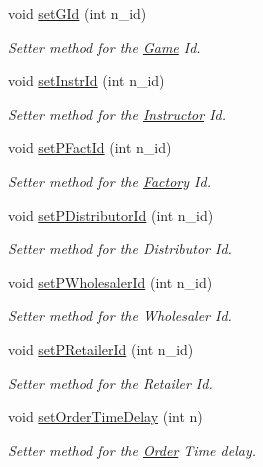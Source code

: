 \begin{DoxyCompactItemize}
void \hyperlink{class_game_a4216dd9e4b966f68cebcd4914a203edb}{set\+G\+Id} (int n\+\_\+id)
\begin{DoxyCompactList}\small\item\em Setter method for the \hyperlink{class_game}{Game} Id. \end{DoxyCompactList}\item 
void \hyperlink{class_game_a7a704228c549b80d48d1b4fb5a8dd512}{set\+Instr\+Id} (int n\+\_\+id)
\begin{DoxyCompactList}\small\item\em Setter method for the \hyperlink{class_instructor}{Instructor} Id. \end{DoxyCompactList}\item 
void \hyperlink{class_game_a727c19b36849f11e1e08d05af9162388}{set\+P\+Fact\+Id} (int n\+\_\+id)
\begin{DoxyCompactList}\small\item\em Setter method for the \hyperlink{class_factory}{Factory} Id. \end{DoxyCompactList}\item 
void \hyperlink{class_game_a98cdfae7d20ad4c4f7a34ed56e64ab7c}{set\+P\+Distributor\+Id} (int n\+\_\+id)
\begin{DoxyCompactList}\small\item\em Setter method for the Distributor Id. \end{DoxyCompactList}\item 
void \hyperlink{class_game_a945968b2490656de58ce89b653eb30e8}{set\+P\+Wholesaler\+Id} (int n\+\_\+id)
\begin{DoxyCompactList}\small\item\em Setter method for the Wholesaler Id. \end{DoxyCompactList}\item 
void \hyperlink{class_game_a80b5a91e9262403dfac82f961056c79a}{set\+P\+Retailer\+Id} (int n\+\_\+id)
\begin{DoxyCompactList}\small\item\em Setter method for the Retailer Id. \end{DoxyCompactList}\item 
void \hyperlink{class_game_af127a9a8e81e7863d6cb73025181a62b}{set\+Order\+Time\+Delay} (int n)
\begin{DoxyCompactList}\small\item\em Setter method for the \hyperlink{class_order}{Order} Time delay. \end{DoxyCompactList}\item 

\end{DoxyCompactItemize}

